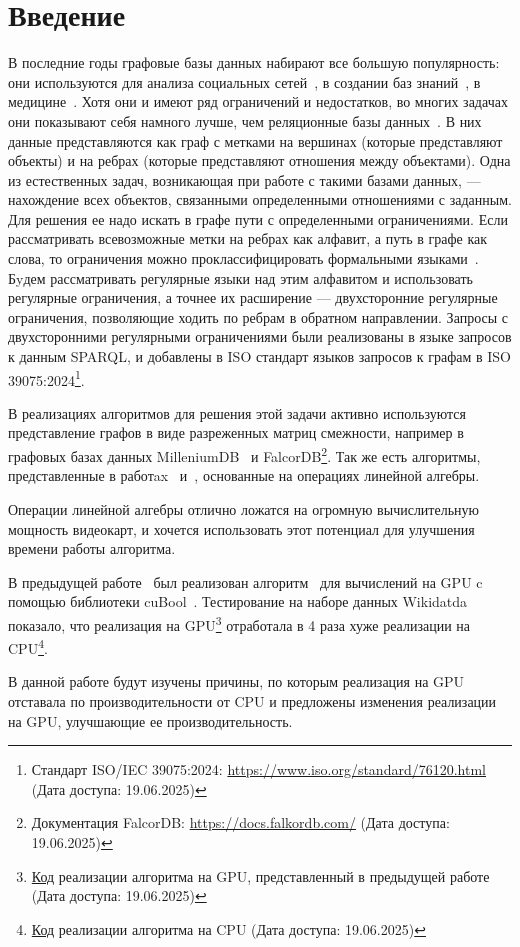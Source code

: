 
\section*{Введение}
\thispagestyle{withCompileDate}

В последние годы графовые базы данных набирают все большую популярность:
они используются для анализа социальных сетей~\cite{SocNets}, в создании баз 
знаний~\cite{Knowledge}, в медицине~\cite{ChemRecEngine}. Хотя они и имеют ряд ограничений
и недостатков, во многих задачах они показывают себя намного лучше, чем реляционные базы
данных~\cite{GraphDatabases}.
В них данные представляются как граф с метками на вершинах (которые представляют объекты)
и на ребрах (которые представляют отношения между объектами). Одна из естественных задач,
возникающая при работе с такими базами данных, --- нахождение всех объектов, связанными
определенными отношениями с заданным. Для решения ее надо искать в графе пути с
определенными ограничениями. Если рассматривать всевозможные метки на ребрах как алфавит,
а путь в графе как слова, то ограничения можно проклассифицировать формальными языками~\cite{FormPathReg}.
Бyдем рассматривать регулярные языки над этим алфавитом и использовать регулярные ограничения,
а точнее их расширение –-- двухсторонние регулярные ограничения, позволяющие
ходить по ребрам в обратном направлении. Запросы с двухсторонними регулярными
ограничениями были реализованы в языке запросов
к данным SPARQL, и добавлены в ISO стандарт языков запросов к графам в ISO 
39075:2024\footnote{Стандарт ISO/IEC 39075:2024: \url{https://www.iso.org/standard/76120.html} (Дата доступа: 19.06.2025)}.

В реализациях алгоритмов для решения этой задачи активно используются представление графов в
виде разреженных матриц смежности, например в графовых базах данных MilleniumDB~\cite{MilleniumDB} и FalcorDB\footnote{Документация FalcorDB: \url{https://docs.falkordb.com/} (Дата доступа: 19.06.2025)}. 
Так же есть алгоритмы, представленные в работax~\cite{sparse-rpq-1} и~\cite{OldRpqVkr}, основанные на операциях линейной алгебры.

Операции линейной алгебры отлично ложатся на огромную вычислительную мощность видеокарт,
и хочется использовать этот потенциал для улучшения времени работы алгоритма. 

В предыдущей работе~\cite{PrevWork} был реализован алгоритм~\cite{OldRpqVkr} для вычислений на GPU c помощью библиотеки cuBool~\cite{CuBool}. Тестирование на наборе данных Wikidatda~\cite{wikidata} показало, что реализация на GPU\footnote{\href{https://github.com/mitya-y/rpq/tree/cb2583e64e51f28dfe16f8e2b66732bc44bb04d5}{Код} реализации алгоритма на GPU, представленный в предыдущей работе (Дата доступа: 19.06.2025)} отработала в 4 раза хуже реализации на CPU\footnote{\href{https://github.com/SparseLinearAlgebra/LAGraph/tree/2-rpq}{Код} реализации алгоритма на CPU (Дата доступа: 19.06.2025)}. 

В данной работе будут изучены причины, по которым реализация на GPU отставала по производительности от CPU и предложены изменения реализации на GPU, улучшающие ее производительность. 

